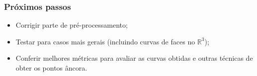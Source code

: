 \begin{frame}
	\frametitle{Próximos passos}
	
	\begin{itemize}
		\item Corrigir parte de pré-processamento;
		\item Testar para casos mais gerais (incluindo curvas de faces no $\mathbb{R}^3$);
		\item Conferir melhores métricas para avaliar as curvas obtidas e outras técnicas de obter os pontos âncora.
	\end{itemize}
	
\end{frame}


